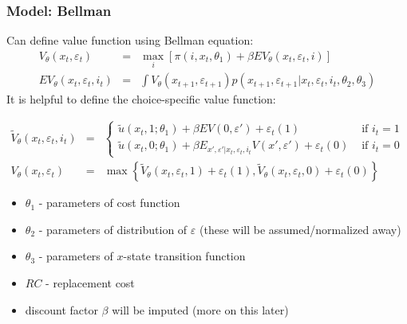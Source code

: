 \documentclass[xcolor=pdftex,dvipsnames,table,mathserif]{beamer}
\begin{document}
\begin{frame}
\frametitle{Model: Bellman}
\footnotesize
 Can define value function using Bellman equation:
 \begin{eqnarray*}
		V_{\theta}\left(x_{t},\varepsilon_{t}\right) &=& \max_{i} \left[ \pi \left(i,x_{t},\theta_1 \right) +
		\beta EV_{\theta}\left(x_{t},\varepsilon_{t},i \right) \right]\\
	 EV_{\theta}\left(x_{t},\varepsilon_{t},i_{t}\right) &=& \int V_{\theta}\left(x_{t+1},\varepsilon_{t+1}\right) p\left(x_{t+1}, \varepsilon_{t+1} |x_{t},\varepsilon_{t},i_{t},\theta_{2},\theta_{3}\right)
\end{eqnarray*}
It is helpful to define the \alert{choice-specific value function}:


\begin{eqnarray*}
\tilde V_{\theta} (x_t, \varepsilon_t, i_t) &=& \left \{ 
\begin{array}{lr}
\tilde u(x_t, 1;\theta_1) + \beta EV(0, \varepsilon ') + \varepsilon_{t}(1) & \text{ if } i_t = 1 \\
\tilde u(x_t , 0; \theta_1) + \beta E_{x', \varepsilon ' | x_t, \varepsilon_t, i_t} V(x', \varepsilon ')  + \varepsilon_{t}(0)  & \text{ if } i_t = 0
\end{array}
\right .\\
V_{\theta}(x_t,\varepsilon_t) &=& \max \left\{ \tilde V_{\theta} (x_t, \varepsilon_t, 1) + \varepsilon_{t}(1) ,\tilde V_{\theta} (x_t, \varepsilon_t, 0) + \varepsilon_{t}(0) \right\}
\end{eqnarray*}
\begin{itemize}
	\item $\theta_{1}$ - parameters of cost function
	\item $\theta_{2}$ - parameters of distribution of $\varepsilon$ (these will be assumed/normalized away)
	\item $\theta_{3}$ - parameters of $x$-state transition function
	\item $RC$ - replacement cost
	\item discount factor $\beta$ will be imputed (more on this later)
\end{itemize}
\end{frame}
\end{document}
